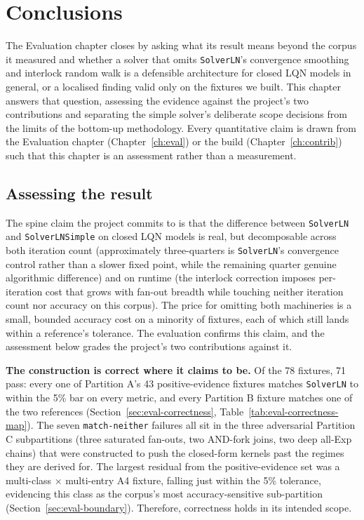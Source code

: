 \chapter{Conclusions}
\label{ch:conclusion}

The Evaluation chapter closes by asking what its result means beyond the corpus it measured and whether a solver that omits \texttt{SolverLN}'s convergence smoothing and interlock random walk is a defensible architecture for closed LQN models in general, or a localised finding valid only on the fixtures we built. This chapter answers that question, assessing the evidence against the project's two contributions and separating the simple solver's deliberate scope decisions from the limits of the bottom-up methodology. Every quantitative claim is drawn from the Evaluation chapter (Chapter~\ref{ch:eval}) or the build (Chapter~\ref{ch:contrib}) such that this chapter is an assessment rather than a measurement.




\section{Assessing the result}
\label{sec:concl-assess}

The spine claim the project commits to is that the difference between \texttt{SolverLN} and \texttt{SolverLNSimple} on closed LQN models is real, but decomposable across both iteration count (approximately three-quarters is \texttt{SolverLN}'s convergence control rather than a slower fixed point, while the remaining quarter genuine algorithmic difference) and on runtime (the interlock correction imposes per-iteration cost that grows with fan-out breadth while touching neither iteration count nor accuracy on this corpus). The price for omitting both machineries is a small, bounded accuracy cost on a minority of fixtures, each of which still lands within a reference's tolerance. The evaluation confirms this claim, and the assessment below grades the project's two contributions against it.

\textbf{The construction is correct where it claims to be.} Of the 78 fixtures, 71 pass: every one of Partition A's 43 positive-evidence fixtures matches \texttt{SolverLN} to within the 5\% bar on every metric, and every Partition B fixture matches one of the two references (Section~\ref{sec:eval-correctness}, Table~\ref{tab:eval-correctness-map}). The seven \texttt{match-neither} failures all sit in the three adversarial Partition C subpartitions (three saturated fan-outs, two AND-fork joins, two deep all-Exp chains) that were constructed to push the closed-form kernels past the regimes they are derived for. The largest residual from the positive-evidence set was a multi-class $\times$ multi-entry A4 fixture, falling just within the 5\% tolerance, evidencing this class as the corpus's most accuracy-sensitive sub-partition (Section~\ref{sec:eval-boundary}). Therefore, correctness holds in its intended scope.

